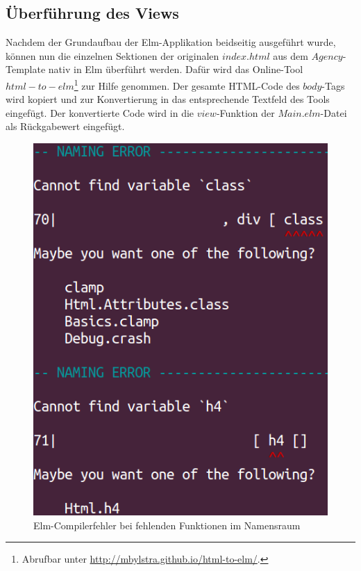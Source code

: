 \subsection{Überführung des Views}
\label{sec:ueberfuehrung-view}
Nachdem der Grundaufbau der Elm-Applikation beidseitig ausgeführt wurde, können nun die einzelnen Sektionen der originalen $index.html$ aus dem $Agency$-Template nativ in Elm überführt werden. Dafür wird das Online-Tool $html-to-elm$\footnote{Abrufbar unter \url{http://mbylstra.github.io/html-to-elm/}.} zur Hilfe genommen. Der gesamte \ac{HTML}-Code des $body$-Tags wird kopiert und zur Konvertierung in das entsprechende Textfeld des Tools eingefügt. Der konvertierte Code wird in die $view$-Funktion der $Main.elm$-Datei als Rückgabewert eingefügt.
\begin{figure}[h]
\centering
\includegraphics[scale=0.5]{img/elm-naming-error.png}
\caption{Elm-Compilerfehler bei fehlenden Funktionen im Namensraum}\label{fig:elm-naming-error}
\end{figure}
